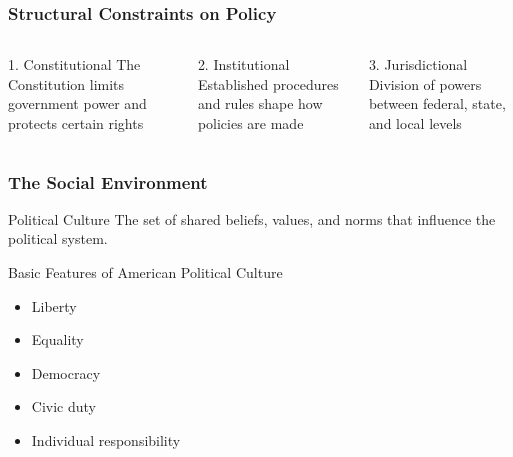 \documentclass[10pt]{beamer}
\begin{document}
\begin{frame}
\frametitle{Structural Constraints on Policy}

\begin{columns}
\begin{column}{0.32\textwidth}
\begin{block}{1. Constitutional}
\pause
The Constitution limits government power and protects certain rights
\end{block}
\end{column}

\begin{column}{0.32\textwidth}
\begin{block}{2. Institutional}
\pause
Established procedures and rules shape how policies are made
\end{block}
\end{column}

\begin{column}{0.32\textwidth}
\begin{block}{3. Jurisdictional}
\pause
Division of powers between federal, state, and local levels
\end{block}
\end{column}
\end{columns}

\end{frame}

\begin{frame}
\frametitle{The Social Environment}

\begin{block}{Political Culture}
The set of shared beliefs, values, and norms that influence the political system.
\end{block}

\pause
\vspace{0.5cm}

\begin{block}{Basic Features of American Political Culture}
\begin{itemize}
\item Liberty
\item Equality
\item Democracy
\item Civic duty
\item Individual responsibility
\end{itemize}
\end{block}

\end{frame}
\end{document}
